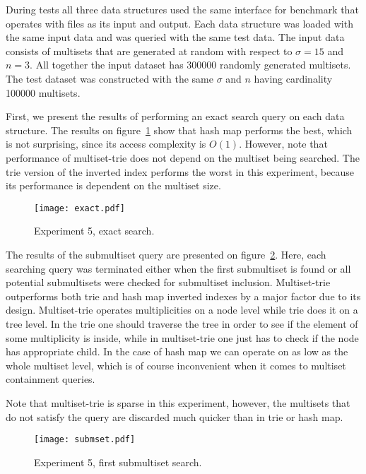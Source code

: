 During tests all three data structures used the same interface for benchmark that operates 
with files as its input and output. Each data structure was loaded with the same input data 
and was queried with the same test data. The input data consists of multisets that are 
generated at random with respect to $\sigma = 15$ and $n = 3.$ All together the input dataset 
has 300000 randomly generated multisets. The test dataset was constructed with the same 
$\sigma$ and $n$ having cardinality 100000 multisets.

First, we present the results of performing an exact search query on each data structure. 
The results on figure~\ref{fig:e5ex} show that hash map performs the best, which is not 
surprising, since its access complexity is $O(1).$ However, note that performance of 
multiset-trie does not depend on the multiset being searched. The trie version of the 
inverted index performs the worst in this experiment, because its performance is dependent 
on the multiset size.

\begin{figure}
\center
\texttt{[image: exact.pdf]}
\caption{Experiment 5, exact search.}
\label{fig:e5ex}
\end{figure}

The results of the submultiset query are presented on figure~\ref{fig:e5subm}. Here, each searching 
query was terminated either when the first submultiset is found or all potential submultisets were 
checked for submultiset inclusion. Multiset-trie outperforms both trie and hash map inverted 
indexes by a major factor due to its design. Multiset-trie operates multiplicities on a node level 
while trie does it on a tree level. In the trie one should traverse the tree in order to see if the element 
of some multiplicity is inside, while in multiset-trie one just has to check if the node has appropriate 
child. In the case of hash map we can operate on as low as the whole multiset level, which is of course 
inconvenient when it comes to multiset containment queries. 

Note that multiset-trie is sparse in this experiment, however, the multisets that do not satisfy the query 
are discarded much quicker than in trie or hash map.

\begin{figure}
\center
\texttt{[image: submset.pdf]}
\caption{Experiment 5, first submultiset search.}
\label{fig:e5subm}
\end{figure}
